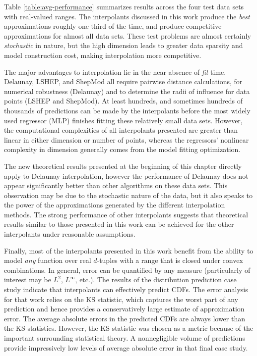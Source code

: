 Table \ref{table:avg-performance} summarizes results across the four
test data sets with real-valued ranges. The interpolants discussed in
this work produce the \textit{best} approximations roughly one third
of the time, and produce competitive approximations for almost all
data sets. These test problems are almost certainly
\textit{stochastic} in nature, but the high dimension leads to greater
data sparsity and model construction cost, making interpolation more
competitive.

The major advantages to interpolation lie in the near absence of
\textit{fit} time. Delaunay, LSHEP, and ShepMod all require pairwise
distance calculations, for numerical robustness (Delaunay) and to
determine the radii of influence for data points (LSHEP and
ShepMod). At least hundreds, and sometimes hundreds of thousands of
predictions can be made by the interpolants before the most widely
used regressor (MLP) finishes fitting these relatively small data
sets.  However, the computational complexities of all interpolants
presented are greater than linear in either dimension or number of
points, whereas the regressors' nonlinear complexity in dimension
generally comes from the model fitting optimization.

The new theoretical results presented at the beginning of this chapter
directly apply to Delaunay interpolation, however the performance of
Delaunay does not appear significantly better than other algorithms on
these data sets.  This observation may be due to the stochastic nature
of the data, but it also speaks to the power of the approximations
generated by the different interpolation methods.  The strong
performance of other interpolants suggests that theoretical results
similar to those presented in this work can be achieved for the other
interpolants under reasonable assumptions.

Finally, most of the interpolants presented in this work benefit from
the ability to model \textit{any} function over real $d$-tuples with a
range that is closed under convex combinations. In general, error can
be quantified by any measure (particularly of interest may be
$L^2$, $L^\infty$, etc.). The results of the distribution prediction
case study indicate that interpolants can effectively predict
CDFs. The error analysis for that work relies on the KS statistic,
which captures the worst part of any prediction and hence provides a
conservatively large estimate of approximation error. The average
absolute errors in the predicted CDFs are always lower than the KS
statistics. However, the KS statistic was chosen as a metric because
of the important surrounding statistical theory. A nonnegligible
volume of predictions provide impressively low levels of average
absolute error in that final case study.


